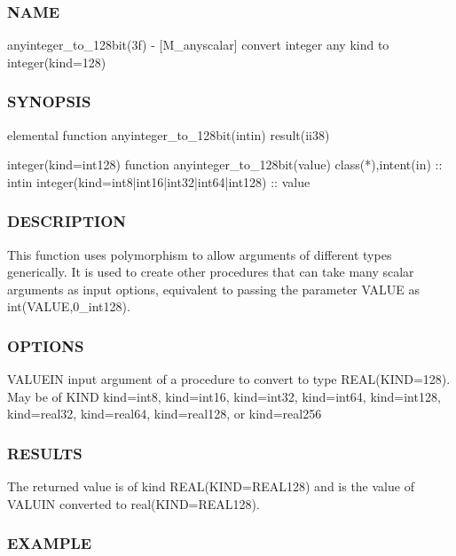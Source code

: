 \subsubsection*{N\+A\+ME}

anyinteger\+\_\+to\+\_\+128bit(3f) -\/ \mbox{[}M\+\_\+anyscalar\mbox{]} convert integer any kind to integer(kind=128)

\subsubsection*{S\+Y\+N\+O\+P\+S\+IS}

\begin{DoxyVerb}elemental function anyinteger_to_128bit(intin) result(ii38)

 integer(kind=int128) function anyinteger_to_128bit(value)
 class(*),intent(in)     :: intin
 integer(kind=int8|int16|int32|int64|int128) :: value
\end{DoxyVerb}


\subsubsection*{D\+E\+S\+C\+R\+I\+P\+T\+I\+ON}

\begin{DoxyVerb}This function uses polymorphism to allow arguments of different types
generically. It is used to create other procedures that can take
many scalar arguments as input options, equivalent to  passing the
parameter VALUE as int(VALUE,0_int128).
\end{DoxyVerb}


\subsubsection*{O\+P\+T\+I\+O\+NS}

\begin{DoxyVerb}VALUEIN  input argument of a procedure to convert to type REAL(KIND=128).
         May be of KIND kind=int8, kind=int16, kind=int32, kind=int64,
         kind=int128, kind=real32, kind=real64, kind=real128,
         or kind=real256
\end{DoxyVerb}
 \subsubsection*{R\+E\+S\+U\+L\+TS}

The returned value is of kind R\+E\+AL(K\+I\+ND=R\+E\+A\+L128) and is the value of V\+A\+L\+U\+IN converted to real(K\+I\+ND=R\+E\+A\+L128). \subsubsection*{E\+X\+A\+M\+P\+LE}

